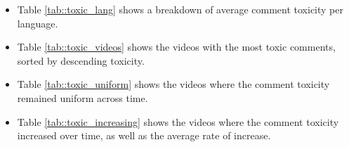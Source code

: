 \documentclass[11pt, a4paper]{article}
\begin{document}
	\begin{itemize}
		\item Table \ref{tab::toxic_lang} shows a breakdown of average comment toxicity per language. 
		
		\item Table \ref{tab::toxic_videos} shows the videos with the most toxic comments, sorted by descending toxicity.
		
		\item Table \ref{tab::toxic_uniform} shows the videos where the comment toxicity remained uniform across time.
		
		\item Table \ref{tab::toxic_increasing} shows the videos where the comment toxicity increased over time, as well as the average rate of increase. 
	\end{itemize}
	
	
	
	
	
	
	
	
	
\end{document}
